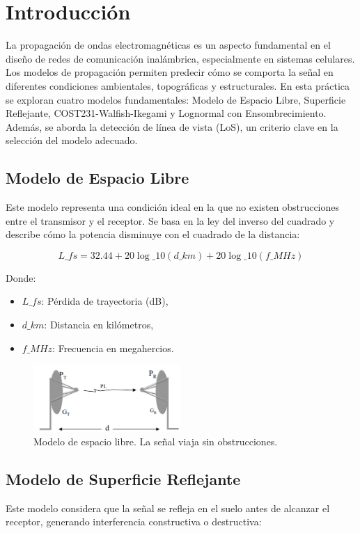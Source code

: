 \section{\Large Introducción}

La propagación de ondas electromagnéticas es un aspecto fundamental en el dise\~no de redes de comunicación inalámbrica, especialmente en sistemas celulares. Los modelos de propagación permiten predecir cómo se comporta la se\~nal en diferentes condiciones ambientales, topográficas y estructurales. En esta práctica se exploran cuatro modelos fundamentales: Modelo de Espacio Libre, Superficie Reflejante, COST231-Walfish-Ikegami y Lognormal con Ensombrecimiento. Además, se aborda la detección de línea de vista (LoS), un criterio clave en la selección del modelo adecuado.

\subsection{Modelo de Espacio Libre}
Este modelo representa una condición ideal en la que no existen obstrucciones entre el transmisor y el receptor. Se basa en la ley del inverso del cuadrado y describe cómo la potencia disminuye con el cuadrado de la distancia:

\begin{equation}
L\_{fs} = 32.44 + 20\log\_{10}(d\_{km}) + 20\log\_{10}(f\_{MHz})
\end{equation}

\noindent Donde:
\begin{itemize}
\item $L\_{fs}$: Pérdida de trayectoria (dB),
\item $d\_{km}$: Distancia en kilómetros,
\item $f\_{MHz}$: Frecuencia en megahercios.
\end{itemize}

\begin{figure}[H]
\centering
\includegraphics[width=0.5\textwidth]{./img/espaciolibre.png}
\caption{Modelo de espacio libre. La se\~nal viaja sin obstrucciones.}
\end{figure}

\subsection{Modelo de Superficie Reflejante}
Este modelo considera que la se\~nal se refleja en el suelo antes de alcanzar el receptor, generando interferencia constructiva o destructiva:

